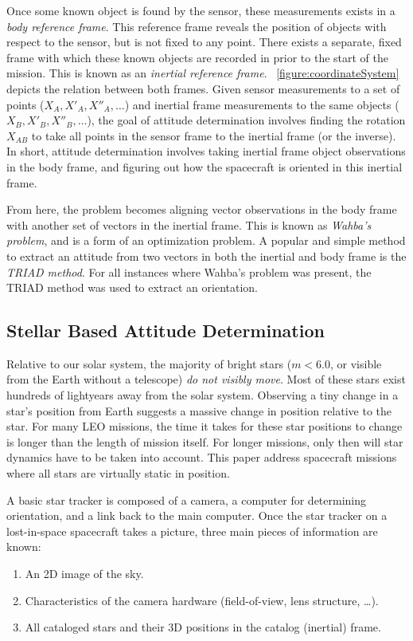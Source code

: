 Once some known object is found by the sensor, these measurements exists in a \textit{body reference frame}.
This reference frame reveals the position of objects with respect to the sensor, but is not fixed to any point.
There exists a separate, fixed frame with which these known objects are recorded in prior to the start of the mission.
This is known as an \textit{inertial reference frame}.
~\autoref{figure:coordinateSystem} depicts the relation between both frames.
Given sensor measurements to a set of points ($X_A, X'_A, X''_A, \ldots$) and inertial frame measurements to the same
objects ($X_B, X'_B, X''_B, \ldots$), the goal of attitude determination involves finding the rotation $X_{AB}$ to
take all points in the sensor frame to the inertial frame (or the inverse).
In short, attitude determination involves taking inertial frame object observations in the body frame, and figuring out
how the spacecraft is oriented in this inertial frame.

From here, the problem becomes aligning vector observations in the body frame with another set of vectors in the
inertial frame.
This is known as \textit{Wahba's problem}, and is a form of an optimization problem.
A popular and simple method to extract an attitude from two vectors in both the inertial and body frame is the
\textit{TRIAD method}.
For all instances where Wahba's problem was present, the TRIAD method was used to extract an orientation.

\subsection{Stellar Based Attitude Determination}\label{subsec:stellarBasedAttitudeDetermination}
Relative to our solar system, the majority of bright stars ($m < 6.0$, or visible from the Earth without a telescope)
\textit{do not visibly move}.
Most of these stars exist hundreds of lightyears away from the solar system.
Observing a tiny change in a star's position from Earth suggests a massive change in position relative to the star.
For many LEO missions, the time it takes for these star positions to change is longer than the length of mission itself.
For longer missions, only then will star dynamics have to be taken into account.
This paper address spacecraft missions where all stars are virtually static in position.

A basic star tracker is composed of a camera, a computer for determining orientation, and a link back to the main
computer.
Once the star tracker on a lost-in-space spacecraft takes a picture, three main pieces of information are known:
\begin{enumerate}
    \item An 2D image of the sky.
    \item Characteristics of the camera hardware (field-of-view, lens structure, \ldots).
    \item All cataloged stars and their 3D positions in the catalog (inertial) frame.
\end{enumerate}

